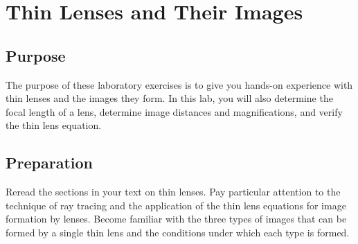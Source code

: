 \chapter{Thin Lenses and Their Images}

\begin{multicols}{2}
\section{Purpose}
  The purpose of these laboratory exercises is to give you hands-on experience with thin lenses and the images they form. In this lab, you will also determine the focal length of a lens, determine image distances and magnifications, and verify the thin lens equation.
  





\section{Preparation}
Reread the sections in your text on thin lenses.  Pay particular attention to the technique of ray tracing and the application of the thin lens equations for image formation by lenses.  Become familiar with the three types of images that can be formed by a single thin lens and the conditions under which each type is formed.


\end{multicols}
